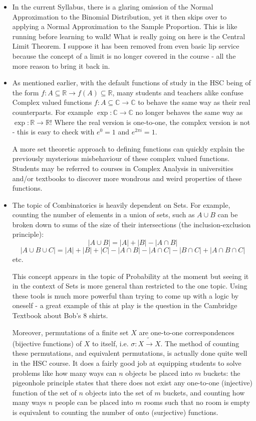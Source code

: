 \documentclass[11pt, a4paper, oneside]{article}
\begin{document}
\begin{itemize}
  \item In the current Syllabus, there is a glaring omission of the Normal Approximation to the Binomial Distribution, yet it then skips over to applying a Normal Approximation to the Sample Proportion. This is like running before learning to walk! What is really going on here is the Central Limit Theorem. I suppose it has been removed from even basic lip service because the concept of a limit is no longer covered in the course - all the more reason to bring it back in.

  \item As mentioned earlier, with the default functions of study in the HSC being of the form $f: A \subseteq \mathbb{R} \rightarrow f(A) \subseteq \mathbb{R}$, many students and teachers alike confuse Complex valued functions $f: A \subseteq \mathbb{C} \rightarrow \mathbb{C}$ to behave the same way as their real counterparts. For example $\exp: \mathbb{C} \rightarrow \mathbb{C}$ no longer behaves the same way as $\exp: \mathbb{R} \rightarrow \mathbb{R}$! Where the real version is one-to-one, the complex version is not - this is easy to check with $e^0 = 1$ and $e^{2\pi i} = 1$.

    A more set theoretic approach to defining functions can quickly explain the previously mysterious misbehaviour of these complex valued functions. Students may be referred to courses in Complex Analysis in universities and/or textbooks to discover more wondrous and weird properties of these functions.

  \item The topic of Combinatorics is heavily dependent on Sets. For example, counting the number of elements in a union of sets, such as $A \cup B$ can be broken down to sums of the size of their intersections (the inclusion-exclusion principle):
    \[ |A \cup B| = |A| + |B| - |A \cap B| \]
    \[ |A \cup B \cup C| = |A| + |B| + |C| - |A \cap B| - |A \cap C| - |B\cap C| + |A \cap B \cap C| \]
    etc.

    This concept appears in the topic of Probability at the moment but seeing it in the context of Sets is more general than restricted to the one topic. Using these tools is much more powerful than trying to come up with a logic by oneself - a great example of this at play is the question in the Cambridge Textbook about Bob's 8 shirts.

    Moreover, permutations of a finite set $X$ are one-to-one correspondences (bijective functions) of $X$ to itself, i.e. $\sigma: X \tilde{\rightarrow} X$. The method of counting these permutations, and equivalent permutations, is actually done quite well in the HSC course. It does a fairly good job at equipping students to solve problems like how many ways can $n$ objects be placed into $m$ buckets: the pigeonhole principle states that there does not exist any one-to-one (injective) function of the set of $n$ objects into the set of $m$ buckets, and counting how many ways $n$ people can be placed into $m$ rooms such that no room is empty is equivalent to counting the number of onto (surjective) functions.
\end{itemize}
\end{document}
